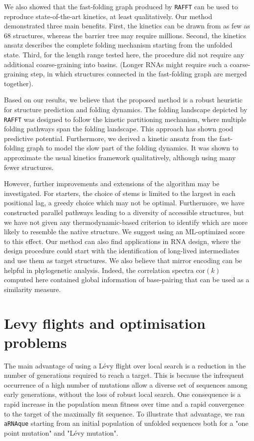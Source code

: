 We also showed that the fast-folding graph produced by \texttt{RAFFT} can be used to reproduce state-of-the-art kinetics, at least qualitatively. Our method demonstrated three main benefits. First, the kinetics can be drawn from as few as $68$ structures, whereas the barrier tree may require millions. Second, the kinetics ansatz describes the complete folding mechanism starting from the unfolded state. Third, for the length range tested here, the procedure did not require any additional coarse-graining into basins. (Longer RNAs might require such a coarse-graining step, in which structures connected in the fast-folding graph are merged together).

Based on our results, we believe that the proposed method is a robust heuristic for structure prediction and folding dynamics. The folding landscape depicted by \texttt{RAFFT} was designed to follow the kinetic partitioning mechanism, where multiple folding pathways span the folding landscape. This approach has shown good predictive potential. Furthermore, we derived a kinetic ansatz from the fast-folding graph to model the slow part of the folding dynamics. It was shown to approximate the usual kinetics framework qualitatively, although using many fewer structures. 

However, further improvements and extensions of the algorithm may be investigated. For starters, the choice of stems is limited to the largest in each positional lag, a greedy choice which may not be optimal. Furthermore, we have constructed parallel pathways leading to a diversity of accessible structures, but we have not given any thermodynamic-based criterion to identify which are more likely to resemble the native structure. We suggest using an ML-optimized score to this effect. Our method can also find applications in RNA design, where the design procedure could start with the identification of long-lived intermediates and use them as target structures. We also believe that mirror encoding can be helpful in phylogenetic analysis. Indeed, the correlation spectra \(\text{cor}(k)\) computed here contained global information of base-pairing that can be used as a similarity measure.

\section{Levy flights and optimisation problems}
The main advantage of using a Lévy flight over local search is a reduction in the number of generations required to reach a target. This is because the infrequent occurrence of a high number of mutations allow a diverse set of sequences among early generations, without the loss of robust local search. One consequence is a rapid increase in the population mean fitness over time and a rapid convergence to the target of the maximally fit sequence. To illustrate that advantage, we ran \texttt{aRNAque} starting from an initial population of unfolded sequences both for a "one point mutation" and "Lévy mutation".

